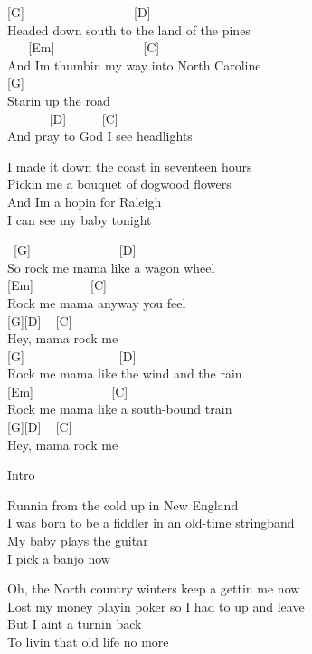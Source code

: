 \documentclass[
  letterpaper,
  twoside=false]{scrbook}
\begin{document}
{[}G{]} ~ ~ ~ ~ ~ ~ ~ ~ ~ ~ {[}D{]}\\
Headed down south to the land of the pines\\
\hspace*{0.333em} ~ ~ {[}Em{]} ~ ~ ~ ~ ~ ~ ~ ~ {[}C{]}\\
And I\textquotesingle m thumbin\textquotesingle{} my way into North
Caroline\\
{[}G{]}\\
Starin\textquotesingle{} up the road\\
\hspace*{0.333em} ~ ~ ~ ~ {[}D{]} ~ ~ ~ {[}C{]}\\
And pray to God I see headlights

I made it down the coast in seventeen hours\\
Pickin\textquotesingle{} me a bouquet of dogwood flowers\\
And I\textquotesingle m a hopin\textquotesingle{} for Raleigh\\
I can see my baby tonight

~{[}G{]} ~ ~ ~ ~ ~ ~ ~ ~ {[}D{]}\\
So rock me mama like a wagon wheel\\
{[}Em{]} ~ ~ ~ ~ ~ {[}C{]}\\
Rock me mama anyway you feel\\
{[}G{]}{[}D{]} ~ {[}C{]}\\
Hey, mama rock me\\
{[}G{]} ~ ~ ~ ~ ~ ~ ~ ~ ~{[}D{]}\\
Rock me mama like the wind and the rain\\
{[}Em{]} ~ ~ ~ ~ ~ ~ ~ {[}C{]}\\
Rock me mama like a south-bound train\\
{[}G{]}{[}D{]} ~ {[}C{]}\\
Hey, mama rock me

Intro

Runnin\textquotesingle{} from the cold up in New England\\
I was born to be a fiddler in an old-time stringband\\
My baby plays the guitar\\
I pick a banjo now

Oh, the North country winters keep a gettin\textquotesingle{} me now\\
Lost my money playin\textquotesingle{} poker so I had to up and leave\\
But I ain\textquotesingle t a turnin\textquotesingle{} back\\
To livin\textquotesingle{} that old life no more
\end{document}
